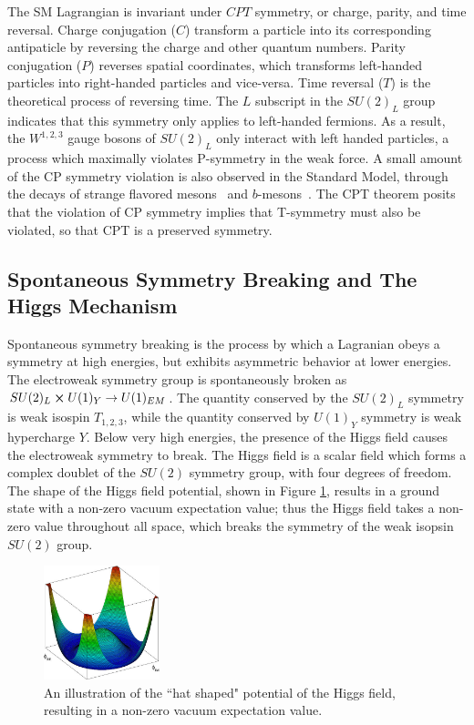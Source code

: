 The SM Lagrangian is invariant under $CPT$ symmetry, or charge, parity, and time reversal. Charge conjugation ($C$) transform a particle into its corresponding antipaticle by reversing the charge and other quantum numbers. Parity conjugation ($P$) reverses spatial coordinates, which transforms left-handed particles into right-handed particles and vice-versa. Time reversal ($T$) is the theoretical process of reversing time. The $L$ subscript in the $SU(2)_L$ group indicates that this symmetry only applies to left-handed fermions. As a result, the $W^{1,2,3}$ gauge bosons of $SU(2)_L$ only interact with left handed particles, a process which maximally violates P-symmetry in the weak force. A small amount of the CP symmetry violation is also observed in the Standard Model, through the decays of strange flavored mesons~\cite{strange_mesons} and $b$-mesons~\cite{bmeson}. The CPT theorem posits that the violation of CP symmetry implies that T-symmetry must also be violated, so that CPT is a preserved symmetry.\par

\subsection{Spontaneous Symmetry Breaking and The Higgs Mechanism}
\label{sec:sponsymbrk}

Spontaneous symmetry breaking is the process by which a Lagranian obeys a symmetry at high energies, but exhibits asymmetric behavior at lower energies. The electroweak symmetry group is spontaneously broken as $SU(2)_L \cross U(1)_Y \rightarrow U(1)_{EM}$. The quantity conserved by the $SU(2)_L$ symmetry is weak isospin $T_{1,2,3}$, while the quantity conserved by $U(1)_Y$ symmetry is weak hypercharge $Y$. Below very high energies, the presence of the Higgs field causes the electroweak symmetry to break. The Higgs field is a scalar field which forms a complex doublet of the $SU(2)$ symmetry group, with four degrees of freedom. The shape of the Higgs field potential, shown in Figure \ref{fig:higgs_field}, results in a ground state with a non-zero vacuum expectation value; thus the Higgs field takes a non-zero value throughout all space, which breaks the symmetry of the weak isopsin $SU(2)$ group. \par

\begin{figure}
	\centering
	\includegraphics[width=0.3\textwidth]{figures/ch1/higgs_field.png}
	\caption{An illustration of the ``hat shaped" potential of the Higgs field, resulting in a non-zero vacuum expectation value. }
	\label{fig:higgs_field}
\end{figure}

